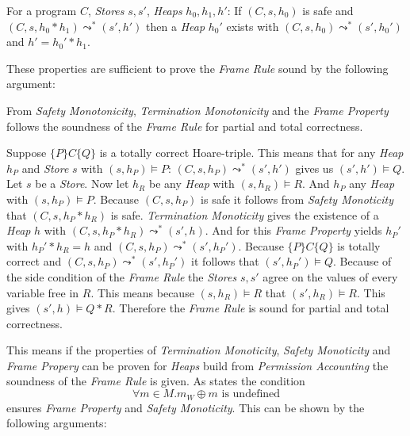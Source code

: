 	\begin{myprop}
		For a program $C$, \emph{Stores} $s,s'$, \emph{Heaps} $h_0,h_1,h'$:
		If $(C,s,h_0)$ is safe and $(C,s,h_0\ast h_1) \leadsto^\ast (s',h')$
		then a \emph{Heap} $h_0'$ exists with $(C,s,h_0)\leadsto^\ast (s',h_0')$
		and $h' = h_0'\ast h_1$.
	\end{myprop}
	These properties are sufficient to prove the \emph{Frame Rule} sound by the
	following argument:
	\begin{mylem}
		From \emph{Safety Monotonicity}, \emph{Termination Monotonicity} and
		the \emph{Frame Property} follows the soundness of the \emph{Frame Rule}
		for partial and total correctness.
	\end{mylem}
	\begin{myproof}
		Suppose $\{P\}C\{Q\}$ is a totally correct Hoare-triple. This means
		that for any \emph{Heap} $h_P$ and \emph{Store} $s$ with $(s,h_P)\models P$:
		$(C,s,h_P)\leadsto^\ast (s',h')$ gives us $(s',h')\models Q$. Let $s$
		be a \emph{Store}.
		Now let $h_R$ be any \emph{Heap} with $(s,h_R)\models R$. And $h_P$ any
		\emph{Heap} with $(s,h_P)\models P$. Because $(C,s,h_P)$ is safe it follows
		from \emph{Safety Monoticity} that $(C,s,h_P\ast h_R)$ is safe.
		\emph{Termination Monoticity} gives the existence of a \emph{Heap} $h$ with
		$(C,s,h_P\ast h_R) \leadsto^\ast (s',h)$. And for this \emph{Frame Property}
		yields $h_P'$ with $h_P'\ast h_R = h$ and $(C,s,h_P)\leadsto^\ast (s',h_P')$.
		Because $\{P\}C\{Q\}$ is totally correct and $(C,s,h_P)\leadsto^\ast (s',h_P')$
		it follows that $(s',h_P')\models Q$. Because of the side condition of the
		\emph{Frame Rule} the \emph{Stores} $s, s'$ agree on the values of every
		variable free in $R$. This means because $(s,h_R)\models R$ that $(s',h_R)\models R$.
		This gives $(s',h)\models Q\ast R$. Therefore the \emph{Frame Rule} is sound
		for partial and total correctness.
	\end{myproof}
	This means if the properties of \emph{Termination Monoticity},
	\emph{Safety Monoticity} and \emph{Frame Propery} can be proven for
	\emph{Heaps} build from \emph{Permission Accounting} the soundness of the
	\emph{Frame Rule} is given. As \cite{PermAcc} states the condition
	$$\forall m\in M. m_W\oplus m \text{ is undefined}$$
	ensures \emph{Frame Property} and \emph{Safety Monoticity}. This can be
	shown by the following arguments:
